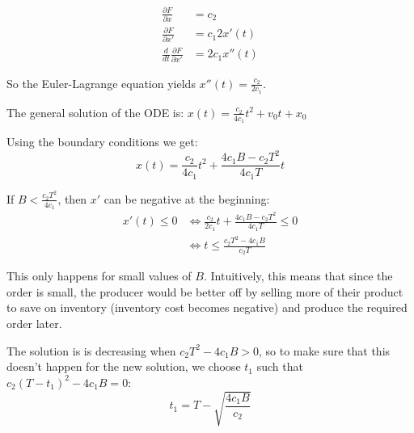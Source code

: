 \documentclass{workbook}
\begin{document}
\begin{solution}
\begin{slide}
\begin{parts}

	\item 
		\begin{align*}
			\frac{\partial F}{\partial x} & = c_2 \\
			\frac{\partial F}{\partial x'} & = c_1 2x'(t) \\
			\frac{d}{dt} \frac{\partial F}{\partial x'} & = 2 c_1 x''(t)
		\end{align*}

		So the Euler-Lagrange equation yields $x''(t) = \frac{c_2}{2c_1}$.
		
	\item 		The general solution of the ODE is: 
			$x(t) = \frac{c_2}{4c_1} t^2 + v_0 t + x_0$
			
		Using the boundary conditions we get:
			\[x(t) = \frac{c_2}{4c_1} t^2 + \frac{4c_1 B-c_2 T^2}{4c_1 T} t\]

	\item 		If $B < \frac{c_2 T^2}{4c_1}$, then $x'$ can be negative at the beginning:
		\begin{align*}
			x'(t) \leq 0 	
				& \Leftrightarrow \frac{c_2}{2c_1} t + \frac{4c_1 B-c_2 T^2}{4c_1 T} \leq 0 \\
				& \Leftrightarrow t \leq \frac{c_2 T^2 - 4c_1 B}{c_2T}	
		\end{align*}
		
		This only happens for small values of $B$. Intuitively, this means that since the order is small, the producer would be better off by selling more of their product to save on inventory (inventory cost becomes negative) and produce the required order later.


	
\end{parts}

\end{slide}	



\begin{slide}
\begin{parts}
	\setcounter{partsitem}{3}

	\item The solution is is decreasing when $c_2 T^2 - 4c_1 B > 0$, so to make sure that this doesn't happen for the new solution, we choose $t_1$ such that $c_2 (T-t_1)^2 - 4c_1 B=0$:
		\[ t_1 = T - \sqrt{ \frac{4c_1 B}{c_2}} \]
	

\end{parts}
\end{slide}
\end{solution}
\end{document}
